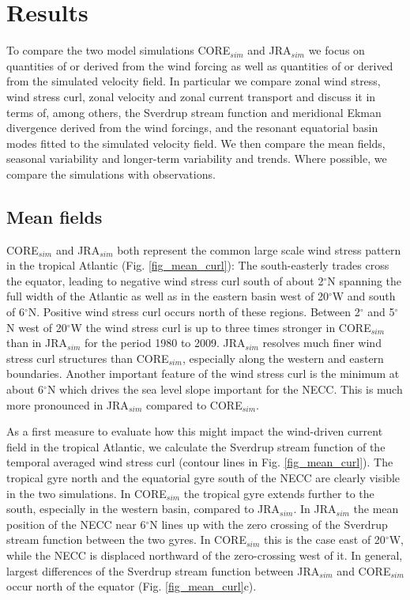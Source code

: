 \documentclass[os, manuscript]{copernicus}
\begin{document}
	\section{Results}
	To compare the two model simulations CORE$_{sim}$ and JRA$_{sim}$ we  focus on quantities of or derived from the wind forcing as well as quantities of or derived from the simulated velocity field. In particular we  compare zonal wind stress, wind stress curl, zonal velocity and zonal current transport and discuss it in terms of, among others, the Sverdrup stream function and meridional Ekman divergence derived from the wind forcings, and the resonant equatorial basin modes fitted to the simulated velocity field. We  then compare the mean fields, seasonal variability and longer-term variability and trends. Where possible, we compare the simulations with observations.
	
	\subsection{Mean fields}
	CORE$_{sim}$ and JRA$_{sim}$ both represent the common large scale wind stress pattern in the tropical Atlantic (Fig. \ref{fig_mean_curl}): The south-easterly trades cross the equator, leading to negative wind stress curl south of about 2$^{\circ}$N spanning the full width of the Atlantic as well as in the eastern basin west of 20$^{\circ}$W and south of 6$^{\circ}$N. Positive wind stress curl occurs north of these regions. Between 2$^{\circ}$ and 5$^{\circ}$N west of 20$^{\circ}$W  the wind stress curl is up to three times stronger in CORE$_{sim}$ than in JRA$_{sim}$ for the period 1980 to 2009. JRA$_{sim}$ resolves much finer wind stress curl structures than CORE$_{sim}$, especially along the western and eastern boundaries. Another important feature of the wind stress curl is the minimum at about 6$^{\circ}$N which drives the sea level slope important for the NECC. This is much more pronounced in JRA$_{sim}$ compared to CORE$_{sim}$.
	
	As a first measure to evaluate how this might impact the wind-driven current field in the tropical Atlantic, we calculate the Sverdrup stream function of the temporal averaged wind stress curl (contour lines in Fig. \ref{fig_mean_curl}). The tropical gyre north and the equatorial gyre south of the NECC are clearly visible in the two simulations. In CORE$_{sim}$ the tropical gyre extends further to the south, especially in the western basin, compared to JRA$_{sim}$. In JRA$_{sim}$ the mean position of the NECC near 6$^{\circ}$N lines up with the zero crossing of the Sverdrup stream function between the two gyres. In CORE$_{sim}$ this is the case east of 20$^{\circ}$W, while the NECC is displaced northward of the zero-crossing west of it. In general, largest differences of the Sverdrup stream function between JRA$_{sim}$ and CORE$_{sim}$ occur north of the equator (Fig. \ref{fig_mean_curl}c). 
	
\end{document}
